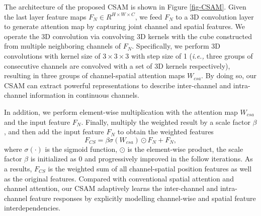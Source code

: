\documentclass[runningheads]{llncs}
\begin{document}
The architecture of the proposed CSAM is shown in Figure \ref{fig-CSAM}. 
Given the last layer feature maps $ F_N \in R^{H\times W \times C} $, 
we feed $F_N$ to a 3D convolution layer~\cite{ji20123d} to generate attention map by capturing joint
channel and spatial features.
We operate the 3D convolution via convolving 3D kernels with the cube constructed from multiple neighboring channels of $F_N$. Specifically, we perform 3D convolutions with kernel size of $ 3\times 3\times 3 $ with step size of 1 (\textit{i.e.,} three groups of consecutive channels are convolved with a set of 3D kernels respectively), resulting
in three groups of channel-spatial attention maps $W_{csa}$.
By doing so, our CSAM can extract powerful representations to describe inter-channel and intra-channel information in continuous channels.

In addition, we perform element-wise multiplication with the attention map $ W_{csa} $ and the input feature $ F_N $. Finally, multiply the weighted result by a scale factor $ \beta $, and then add the input feature $F_N$ to obtain the weighted features
\begin{equation}
F_{CS}=\beta \sigma(W_{csa}) \odot F_N + F_N ,
\end{equation}
where $\sigma(\cdot)$ is the sigmoid function, $ \odot $ is the element-wise product, the scale factor $ \beta $ is initialized as 0 and progressively improved in the follow iterations. 
As a results, $F_{CS}$ is the weighted sum of all channel-spatial position features as well as the original features. Compared with conventional spatial attention and channel attention, our CSAM adaptively learns the inter-channel and intra-channel feature responses by explicitly modelling channel-wise and spatial feature interdependencies.
\end{document}
